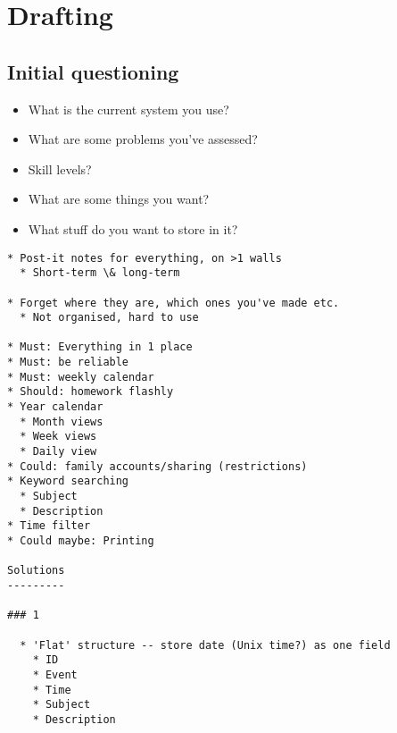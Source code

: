 \section{Drafting}

\subsection{Initial questioning}

\begin{itemize}
  \item What is the current system you use?
  \item What are some problems you've assessed?
  \item Skill levels?
  \item What are some things you want?
  \item What stuff do you want to store in it?
\end{itemize}

\begin{verbatim}
* Post-it notes for everything, on >1 walls
  * Short-term \& long-term

* Forget where they are, which ones you've made etc.
  * Not organised, hard to use

* Must: Everything in 1 place
* Must: be reliable
* Must: weekly calendar
* Should: homework flashly
* Year calendar
  * Month views
  * Week views
  * Daily view
* Could: family accounts/sharing (restrictions)
* Keyword searching
  * Subject
  * Description
* Time filter
* Could maybe: Printing

Solutions
---------

### 1

  * 'Flat' structure -- store date (Unix time?) as one field
    * ID
    * Event
    * Time
    * Subject
    * Description
\end{verbatim}
